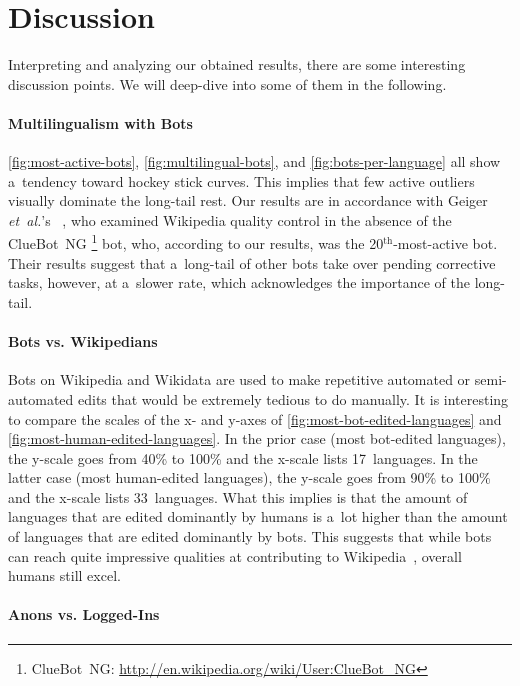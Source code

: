 \documentclass{sig-alternate}
\newcommand{\superscript}[1]{\ensuremath{^{\textrm{#1}}}}
\newcommand{\inlinelistingsize}{\fontsize{8pt}{11pt}}
\let\oldurl\url
\renewcommand{\url}[1]{\inlinelistingsize\oldurl{#1}}
\begin{document}
\section{Discussion}

Interpreting and analyzing our obtained results,
there are some interesting discussion points.
We will deep-dive into some of them in the following.

\paragraph{Multilingualism with Bots}

\autoref{fig:most-active-bots}, \autoref{fig:multilingual-bots},
and \autoref{fig:bots-per-language} all show a~tendency toward
hockey stick curves.
This implies that few active outliers visually dominate
the long-tail rest.
Our results are in accordance with Geiger \emph{et~al.}'s%
~\cite{geiger2013withoutbots}, who examined Wikipedia 
quality control in the absence of the ClueBot~NG%
\footnote{ClueBot~NG: \url{http://en.wikipedia.org/wiki/User:ClueBot_NG}} bot, who, according to our results,
was the 20\superscript{th}-most-active bot.
Their results suggest that a~long-tail of other bots
take over pending corrective tasks, however, at a~slower rate,
which acknowledges the importance of the long-tail.

\paragraph{Bots vs. Wikipedians}
\label{sec:bots-vs-wikipedians}

Bots on Wikipedia and Wikidata are used to make
repetitive automated or semi-automated edits
that would be extremely tedious to do manually.
It is interesting to compare the scales of the x- and y-axes of
\autoref{fig:most-bot-edited-languages} and
\autoref{fig:most-human-edited-languages}.
In the prior case (most bot-edited languages),
the y-scale goes from 40\% to 100\%
and the x-scale lists 17~languages.
In the latter case (most human-edited languages),
the y-scale goes from 90\% to 100\%
and the x-scale lists 33~languages.
What this implies is that the amount of languages that are
edited dominantly by humans is a~lot higher than the amount
of languages that are edited dominantly by bots.
This suggests that while bots can reach quite
impressive qualities at contributing to Wikipedia~\cite{guldbrandsson2013bots},
overall humans still excel.

\paragraph{Anons vs. Logged-Ins}
\end{document}
